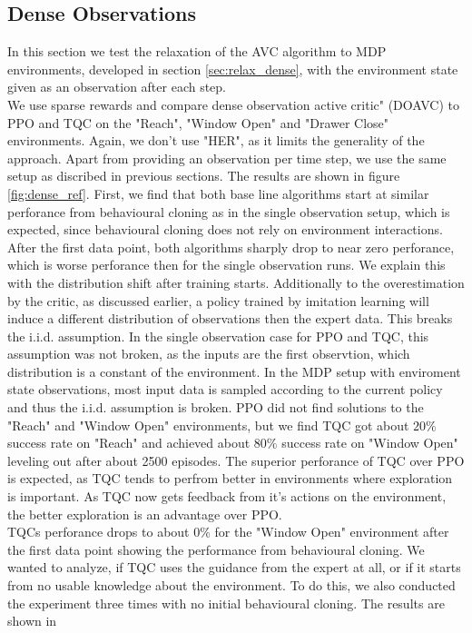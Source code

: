\subsection{Dense Observations}
In this section we test the relaxation of the AVC algorithm to MDP environments, developed in section \ref{sec:relax_dense}, with the environment state given as an observation after each step. \\
We use sparse rewards 
and compare dense observation active critic" (DOAVC) to PPO and TQC on the "Reach", "Window Open" and "Drawer Close" environments. Again, we don't use "HER", as it limits the generality of 
the approach. Apart from 
providing an observation per time step,
we use the same setup as discribed in previous sections. The results are shown in figure \ref{fig:dense_ref}. First, we find that both base line algorithms 
start at similar perforance from behavioural cloning as in the single observation setup, which is expected, since behavioural cloning does not rely on 
environment interactions. After the first data point, both algorithms sharply drop to near zero perforance, which is worse perforance then for the single 
observation runs. We explain this with the distribution shift after training starts. Additionally to the overestimation by the critic, as discussed earlier, a policy trained by imitation learning 
will induce a different distribution of observations then the expert data. This breaks the i.i.d. assumption. In the single observation case for PPO and TQC, this assumption was not broken, 
as the inputs are the first observtion, which distribution is a constant of the environment. In the MDP setup with enviroment state observations, most input data is 
sampled according to the current policy and thus the i.i.d. assumption is broken. PPO did not find solutions to the "Reach" and "Window Open" environments, 
but we find TQC got about $20 \%$ success rate on "Reach" and achieved about $80 \%$ success rate on "Window Open" leveling out after about 2500 episodes. 
The superior perforance of TQC over PPO is expected, as TQC tends to perfrom better in environments where exploration is important. As TQC now gets 
feedback from it's actions on the environment, the better exploration is an advantage over PPO.\\ 
TQCs perforance drops to about $0 \%$ for the "Window Open" 
environment after the first data point showing the performance from behavioural cloning. We wanted to analyze, if TQC uses the guidance from the expert at all, or if it starts from 
no usable knowledge about the environment. To do this, we also conducted the experiment three times with no initial behavioural cloning. The results are shown in 
